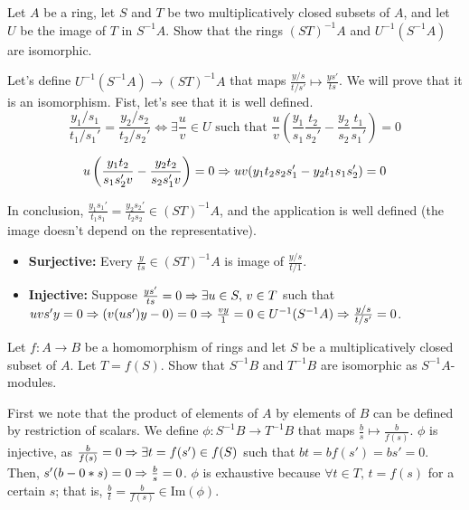 \begin{ex}
	Let $A$ be a ring, let $S$ and $T$ be two multiplicatively closed subsets of $A$, and let $U$ be the image of $T$ in $S^{-1}A$. Show that the rings $(ST)^{-1}A$ and $U^{-1} (S^{-1} A)$ are isomorphic.
\end{ex}

\begin{sol}
	Let's define $U^{-1} (S^{-1} A) \to (ST)^{-1}A$ that maps $\frac{y/s}{t/s'} \mapsto \frac{ys'}{ts}$. We will prove that it is an isomorphism. Fist, let's see that it is well defined.
	\[
		\frac{y_1/s_1}{t_1/s_1'} = \frac{y_2/s_2}{t_2/s_2'} \iff \exists \frac{u}{v} \in U \text{ such that } \frac{u}{v} \left ( \frac{y_1}{s_1}\frac{t_2}{s_2'} - \frac{y_2}{s_2}\frac{t_1}{s_1'} \right ) = 0
	\]

	\[
		u \left ( \frac{y_1 t_2}{s_1 s_2' v} - \frac{y_2 t_2}{s_2 s_1' v} \right ) = 0 \Rightarrow uv (y_1 t_2 s_2 s_1' - y_2 t_1 s_1 s_2') = 0
	\]

	In conclusion, $\frac{y_1 s_1'}{t_1 s_1} = \frac{y_2 s_2'}{t_2 s_2} \in (ST)^{-1}A$, and the application is well defined (the image doesn't depend on the representative).


	\begin{itemize}
		\item \textbf{Surjective:} Every $\frac{y}{ts} \in (ST)^{-1}A$ is image of $\frac{y/s}{t/1}$.
		\item \textbf{Injective:} Suppose $\frac{ys'}{ts} = 0 \Rightarrow \exists u \in S, \, v \in T$ such that $uv s'y = 0 \Rightarrow (v(us')y -0) = 0 \Rightarrow \frac{vy}{1} = 0 \in U^{-1} (S^{-1} A) \Rightarrow \frac{y/s}{t/s'} = 0$.		
	\end{itemize}
\end{sol}

\begin{ex}
	Let $f: A \to B$ be a homomorphism of rings and let $S$ be a multiplicatively closed subset of $A$. Let $T= f(S)$. Show that $S^{-1} B$ and $T^{-1} B$ are isomorphic as $S^{-1}A$-modules.
\end{ex}

\begin{sol}
	First we note that the product of elements of $A$ by elements of $B$ can be defined by restriction of scalars. We define $\phi: S^{-1}B \to T^{-1}B$ that maps $\frac{b}{s} \mapsto \frac{b}{f(s)}$. $\phi$ is injective, as $\frac{b}{f(s)} = 0 \Rightarrow \exists t = f(s') \in f(S)$ such that $bt = bf(s') = bs' = 0$. Then, $s'(b-0*s) = 0 \Rightarrow \frac{b}{s} = 0$. $\phi$ is exhaustive because $\forall t \in T, \, t = f(s)$ for a certain $s$; that is, $\frac{b}{t} = \frac{b}{f(s)} \in \text{Im}(\phi)$.
\end{sol}

